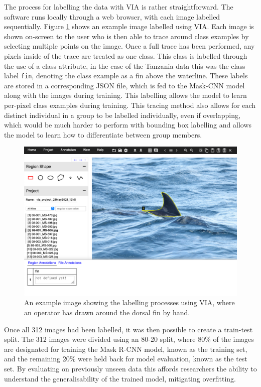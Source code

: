 The process for labelling the data with VIA is rather straightforward. The software runs locally through a web browser, with each image labelled sequentially. Figure \ref{fig:via-json-example-zanzibar} shows an example image labelled using VIA. Each image is shown on-screen to the user who is then able to trace around class examples by selecting multiple points on the image. Once a full trace has been performed, any pixels inside of the trace are treated as one class. This class is labelled through the use of a class attribute, in the case of the Tanzania data this was the class label \texttt{fin}, denoting the class example as a fin above the waterline. These labels are stored in a corresponding JSON file, which is fed to the Mask-CNN model along with the images during training. This labelling allows the model to learn per-pixel class examples during training. This tracing method also allows for each distinct individual in a group to be labelled individually, even if overlapping, which would be much harder to perform with bounding box labelling and allows the model to learn how to differentiate between group members.  

  \begin{figure}
	\begin{center}
		\includegraphics[scale=0.4]{Chapter3/figs/via-json-example-zanzibar-1.png}
	\end{center}
	\caption{An example image showing the labelling processes using VIA, where an operator has drawn around the dorsal fin by hand.
	}
	\label{fig:via-json-example-zanzibar}
\end{figure}

Once all 312 images had been labelled, it was then possible to create a train-test split. The 312 images were divided using an 80-20 split, where 80\% of the images are designated for training the Mask R-CNN model, known as the training set, and the remaining 20\% were held back for model evaluation, known as the test set. By evaluating on previously unseen data this affords researchers the ability to understand the generalisability of the trained model, mitigating overfitting. 

